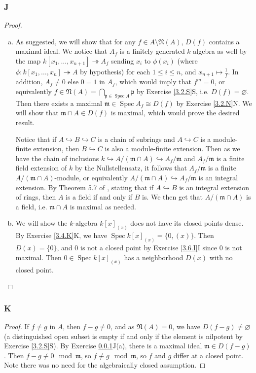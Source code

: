 \documentclass{article}
\newcommand{\frkm}{\mathfrak{m}}
\newcommand{\frkp}{\mathfrak{p}}
\newcommand{\frkN}{\mathfrak{N}}
\DeclareMathOperator{\Spec}{\mathrm{Spec}}
\let\emptyset\varnothing
\begin{document}
\subsubsection{J}\label{3.6.J}
\begin{proof}
    \begin{enumerate}[(a)]
        \item As suggested, we will show that for any $f\in A\setminus \frkN(A)$, $D(f)$ contains a maximal ideal. We notice that $A_f$ is a finitely generated $k$-algebra as well by the map $k[x_1,\dots,x_{n+1}]\twoheadrightarrow A_f$ sending $x_i$ to $\phi(x_i)$ (where $\phi:k[x_1,\dots,x_n]\twoheadrightarrow A$ by hypothesis) for each $1\le i \le n$, and $x_{n+1}\mapsto \frac{1}{f}$. In addition, $A_f\ne 0$ else $0=1$ in $A_f$, which would imply that $f^m=0$, or equivalently $f\in \frkN(A)=\bigcap_{\frkp \in \Spec A} \frkp$ by Exercise \ref{3.2.S}S, i.e. $D(f)=\emptyset$. Then there exists a maximal $\frkm \in \Spec A_f \cong D(f)$ by Exercise \ref{3.2.N}N. We will show that $\frkm \cap A \in D(f)$ is maximal, which would prove the desired result.
        
        Notice that if $A\hookrightarrow B \hookrightarrow C$ is a chain of subrings and $A\hookrightarrow C$ is a module-finite extension, then $B\hookrightarrow C$ is also a module-finite extension. Then as we have the chain of inclusions $k\hookrightarrow A/(\frkm \cap A) \hookrightarrow A_f/\frkm$ and $A_f/\frkm$ is a finite field extension of $k$ by the Nullstellensatz, it follows that $A_f/\frkm$ is a finite $A/(\frkm\cap A)$-module, or equivalently $A/(\frkm \cap A) \hookrightarrow A_f/\frkm$ is an integral extension. By Theorem 5.7 of \cite{Atiyah-Macdonald}, stating that if $A\hookrightarrow B$ is an integral extension of rings, then $A$ is a field if and only if $B$ is. We then get that $A/(\frkm \cap A)$ is a field, i.e. $\frkm \cap A$ is maximal as needed.
        \item We will show the $k$-algebra $k[x]_{(x)}$ does not have its closed points dense. By Exercise \ref{3.4.K}K, we have $\Spec k[x]_{(x)}=\{0, (x)\}$. Then $D(x)=\{0\}$, and $0$ is not a closed point by Exercise \ref{3.6.I}I since $0$ is not maximal. Then $0\in \Spec k[x]_{(x)}$ has a neighborhood $D(x)$ with no closed point.
    \end{enumerate}
\end{proof}
\subsubsection{K}\label{3.6.K}
\begin{proof}
    If $f \ne g$ in $A$, then $f-g\ne 0$, and as $\frkN(A)=0$, we have $D(f-g)\ne \emptyset$ (a distinguished open subset is empty if and only if the element is nilpotent by Exercise \ref{3.2.S}S). By Exercise \ref{3.6.J}J(a), there is a maximal ideal $\frkm \in D(f-g)$. Then $f-g\not \equiv 0 \mod \frkm$, so $f\not \equiv g \mod \frkm$, so $f$ and $g$ differ at a closed point. Note there was no need for the algebraically closed assumption.
\end{proof}
\end{document}
